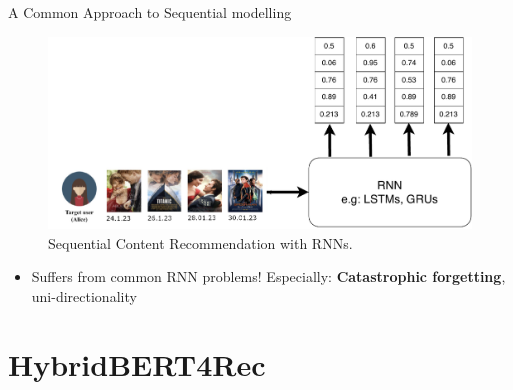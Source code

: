 \documentclass[en]{sdqbeamer}
\begin{document}
\begin{frame}{A Common Approach to Sequential modelling}
	\begin{figure}
		\includegraphics[height=0.45\textheight]{images/rnn_seq.pdf}
		\caption{Sequential Content Recommendation with RNNs. \cite{yuDynamicRecurrentModel2016}}
	\end{figure}
	\begin{itemize}
		\item Suffers from common RNN problems! Especially: \textbf{Catastrophic forgetting}, uni-directionality \cite{channarongHybridBERT4RecHybridContentBased2022}
	\end{itemize}
\end{frame}

\section{HybridBERT4Rec}
\end{document}
